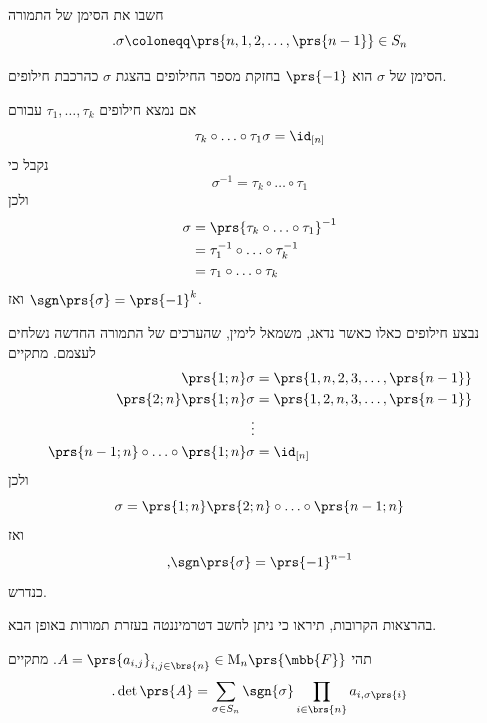 \documentclass[a4paper,10pt,twoside,openany]{book}
\renewcommand{\Mat}{\mathrm{M}}
\begin{document}
\begin{exercisechap}
חשבו את הסימן של התמורה
\[\text{.} \sigma \coloneqq \prs{n, 1, 2, \ldots, \prs{n-1}} \in S_n\]
\end{exercisechap}

\begin{solution}
הסימן של
$\sigma$
הוא
$\prs{-1}$
בחזקת מספר החילופים בהצגת
$\sigma$
כהרכבת חילופים.

אם נמצא חילופים
$\tau_1, \ldots, \tau_k$
עבורם
\[\tau_k \circ \ldots \circ \tau_1 \sigma = \id_{[n]}\]
נקבל כי
\[\sigma^{-1} = \tau_k \circ \ldots \circ \tau_1\]
ולכן
\begin{align*}
\sigma &= \prs{\tau_k \circ \ldots \circ \tau_1}^{-1}
\\&= \tau_1^{-1} \circ \ldots \circ \tau_k^{-1}
\\&= \tau_1 \circ \ldots \circ \tau_k
\end{align*}
ואז
$\sgn\prs{\sigma} = \prs{-1}^k$.

נבצע חילופים כאלו כאשר נדאג, משמאל לימין, שהערכים של התמורה החדשה נשלחים לעצמם.
מתקיים
\begin{align*}
\prs{1;n} \sigma &= \prs{1, n, 2, 3, \ldots, \prs{n-1}} \\
\prs{2;n} \prs{1;n} \sigma &= \prs{1, 2, n, 3, \ldots, \prs{n-1}} \\
\vdots \\
\prs{n-1;n} \circ \ldots \circ \prs{1;n} \sigma &= \id_{[n]}
\end{align*}
ולכן
\[\sigma = \prs{1;n} \prs{2;n} \circ \ldots \circ \prs{n-1;n}\]
ואז
\[\text{,} \sgn\prs{\sigma} = \prs{-1}^{n-1}\]
כנדרש.
\end{solution}

בהרצאות הקרובות, תיראו כי ניתן לחשב דטרמיננטה בעזרת תמורות באופן הבא.

\begin{proposition}
תהי
$A = \prs{a_{i,j}}_{i,j \in \brs{n}} \in \Mat_n\prs{\mbb{F}}$.
מתקיים
\[\text{.} \det\prs{A} = \sum_{\sigma \in S_n} \sgn{\sigma} \prod_{i \in \brs{n}} a_{i,\sigma\prs{i}}\]
\end{proposition}
\end{document}
